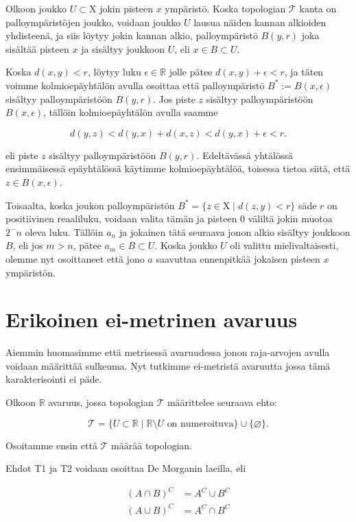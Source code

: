 \documentclass[12pt,a4paper,leqno]{report}
\newcommand{\R}{\mathbb{R}}
\newcommand{\X}{\mathrm{X}}
\newcommand{\T}{\mathcal{T}}
\theoremstyle{plain}
\theoremstyle{definition}
\theoremstyle{remark}
\begin{document}
Olkoon joukko $U \subset \X$ jokin pisteen $x$ ympäristö. Koska topologian $\T$ kanta on palloympäristöjen joukko, voidaan joukko $U$ lausua näiden kannan alkioiden yhdisteenä, ja siis löytyy jokin kannan alkio, palloympäristö $B(y,r)$ joka sisältää pisteen $x$ ja sisältyy joukkoon $U$, eli $x \in B \subset U$.

Koska $d(x,y) < r$, löytyy luku $\epsilon \in \R$ jolle pätee $d(x,y) + \epsilon < r$, ja täten voimme kolmioepäyhtälön avulla osoittaa että palloympäristö $B^* := B(x,\epsilon)$ sisältyy palloympäristöön $B(y,r)$. Jos piste $z$ sisältyy palloympäristöön $B(x,\epsilon)$, tällöin kolmioepäyhtälön avulla saamme

\begin{equation}
d(y,z) < d(y,x) + d(x,z) < d(y,x) + \epsilon < r\text{.}
\end{equation}

eli piste $z$ sisältyy palloympäristöön $B(y,r)$. Edeltävässä yhtälössä ensimmäisessä epäyhtälössä käytimme kolmioepäyhtälöä, toisessa tietoa siitä, että $z \in B(x,\epsilon)$.

Toisaalta, koska joukon palloympäristön $B^* = \{z \in \X \mid d(z,y) < r\}$ säde $r$ on positiivinen reaaliluku, voidaan valita tämän ja pisteen $0$ väliltä jokin muotoa $2^-n$ oleva luku. Tällöin $a_n$ ja jokainen tätä seuraava jonon alkio sisältyy joukkoon $B$, eli jos $m > n$, pätee $a_m \in B \subset U$. Koska joukko $U$ oli valittu mielivaltaisesti, olemme nyt osoittaneet että jono $a$ saavuttaa ennenpitkää jokaisen pisteen $x$ ympäristön.

\chapter{Erikoinen ei-metrinen avaruus}
Aiemmin huomasimme että metrisessä avaruudessa jonon raja-arvojen avulla voidaan määrittää sulkeuma. Nyt tutkimme ei-metristä avaruutta jossa tämä karakterisointi ei päde.

Olkoon $\R$ avaruus, jossa topologian $\T$ määrittelee seuraava ehto:

\begin{equation}
\T = \{U \subset \R \mid \R \setminus U \text{ on numeroituva} \} \cup \{ \varnothing \}\text{.}
\end{equation}

Osoitamme ensin että $\T$ määrää topologian.

Ehdot T1 ja T2 voidaan osoittaa De Morganin laeilla, eli 

\begin{align}
(A \cap B)^C &= A^C \cup B^C \\
(A \cup B)^C &= A^C \cap B^C
\end{align}
\end{document}
